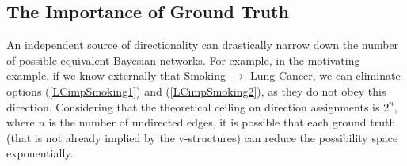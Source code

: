 \documentclass{article}
\begin{document}
	\subsection{The Importance of Ground Truth}
	An independent source of directionality can drastically narrow down the number of possible equivalent Bayesian networks. For example, in the motivating example, if we know externally that Smoking $\rightarrow$ Lung Cancer, we can eliminate options (\ref{LCimpSmoking1}) and (\ref{LCimpSmoking2}), as they do not obey this direction.
	Considering that the theoretical ceiling on direction assignments is $2^n$, where $n$ is the number of undirected edges, it is possible that each ground truth (that is not already implied by the v-structures) can reduce the possibility space exponentially.
	
	
	
	
	\appendix
	
\end{document}
